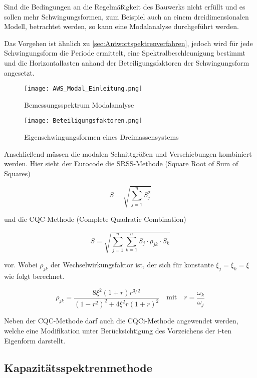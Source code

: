 Sind die Bedingungen an die Regelmäßigkeit des Bauwerks nicht erfüllt und es sollen mehr Schwingungsformen, zum Beispiel auch an einem dreidimensionalen Modell, betrachtet werden, so kann eine Modalanalyse durchgeführt werden.

Das Vorgehen ist ähnlich zu \cref{sec:Antwortspektrenverfahren}, jedoch wird für jede Schwingungsform die Periode ermittelt, eine Spektralbeschleunigung bestimmt und die Horizontallasten anhand der Beteiligungsfaktoren der Schwingungsform angesetzt.

\begin{figure}[H]
    \centering
    \texttt{[image: AWS\_Modal\_Einleitung.png]}
    \caption{Bemessungsspektrum Modalanalyse}
\end{figure}

\begin{figure}[H]
    \centering
    \texttt{[image: Beteiligungsfaktoren.png]}
    \caption{Eigenschwingungsformen eines Dreimassensystems \cite{Pocanschi}}
\end{figure}

Anschließend müssen die modalen Schnittgrößen und Verschiebungen kombiniert werden. Hier sieht der Eurocode die SRSS-Methode (Square Root of Sum of Squares)

\begin{equation*}
S = \sqrt{\sum_{j=1}^{n}S_j^2}
\end{equation*}

und die CQC-Methode (Complete Quadratic Combination)

\begin{equation*}
S = \sqrt{\sum_{j=1}^{n}\sum_{k=1}^{n} S_j \cdot \rho_{jk} \cdot S_k}
\end{equation*}

vor. Wobei $\rho_{jk}$ der Wechselwirkungsfaktor ist, der sich für konstante $\xi_j = \xi_k = \xi$ wie folgt berechnet.

\begin{equation*}
\rho_{jk} = \frac{8 \xi^2 (1 + r) r^{3/2}}{(1 - r^2)^2 + 4 \xi^2 r ( 1 + r)^2}
\quad\mathrm{mit}\quad 
r = \frac{\omega_k}{\omega_j}
\end{equation*}

Neben der CQC-Methode darf auch die CQCi-Methode angewendet werden, welche eine Modifikation unter Berücksichtigung des Vorzeichens der i-ten Eigenform darstellt.



\subsection{Kapazitätsspektrenmethode}
\label{sec:Kapazitaetsspektrenmethode}

